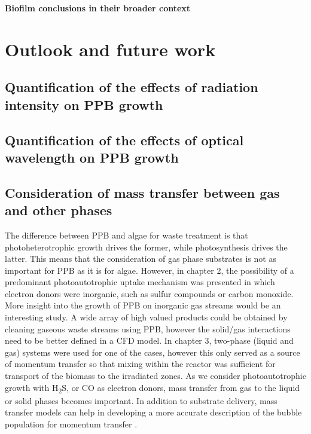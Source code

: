 \skippingparagraph
\textbf{Biofilm conclusions in their broader context}



\section{Outlook and future work}
\subsection{Quantification of the effects of radiation intensity on PPB growth}





\subsection{Quantification of the effects of optical wavelength on PPB growth}


\subsection{Consideration of mass transfer between gas and other phases}
The difference between PPB and algae for waste treatment is that photoheterotrophic growth drives the former, while photosynthesis drives the latter. This means that the consideration of gas phase substrates is not as important for PPB as it is for algae. However, in chapter 2, the possibility of a predominant photoautotrophic uptake mechanism was presented in which electron donors were inorganic, such as sulfur compounds or carbon monoxide. More insight into the growth of PPB on inorganic gas streams would be an interesting study. A wide array of high valued products could be obtained by cleaning gaseous waste streams using PPB, however the solid/gas interactions need to be better defined in a CFD model. In chapter 3, two-phase (liquid and gas) systems were used for one of the cases, however this only served as a source of momentum transfer so that mixing within the reactor was sufficient for transport of the biomass to the irradiated zones. As we consider photoautotrophic growth with H\textsubscript{2}S, or CO as electron donors, mass transfer from gas to the liquid or solid phases becomes important. In addition to substrate delivery, mass transfer models can help in developing a more accurate description of the bubble population for momentum transfer \cite{Krishna2003}.

